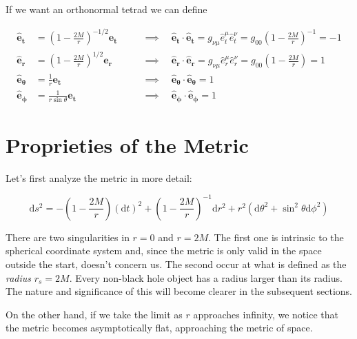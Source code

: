 If we want an orthonormal tetrad we can define

\begin{subequations}
\begin{align}
    \mathbf{\hat e_t} &= \left(1 - \frac{2M}{r}\right)^{-1/2} \mathbf{e_t}
    \quad &&\implies \quad
    \mathbf{\hat e_t \cdot \hat e_t} = g_{\nu \mu} \hat e_t^\mu \hat e_t^\nu
    = g_{00} \left(1 - \frac{2M}{r}\right)^{-1} = - 1
    \label{cap1:eq:local_ON_base_t}\\
    \mathbf{\hat e_r} &= \left(1 - \frac{2M}{r}\right)^{1/2} \mathbf{e_r}
    \quad &&\implies \quad
    \mathbf{\hat e_r \cdot \hat e_r} = g_{\nu \mu} \hat e_r^\mu \hat e_r^\nu
    = g_{00} \left(1 - \frac{2M}{r}\right) = 1 \\
    \mathbf{\hat e_\theta} &= \frac{1}{r} \mathbf{e_t}
    \quad &&\implies \quad
    \mathbf{\hat e_\theta \cdot \hat e_\theta} = 1 \\
    \mathbf{\hat e_\phi} &= \frac{1}{r \sin \theta} \mathbf{e_t}
    \quad &&\implies \quad
    \mathbf{\hat e_\phi \cdot \hat e_\phi} = 1
\end{align}
    \label{cap1:eq:local_ON_base}
\end{subequations}

\newpage


\section{Proprieties of the Metric}

Let's first analyze the \Sh metric in more detail:

\begin{equation}
    \mathrm{d}s^2 = - \left(1 - \frac{2 M}{r} \right) (\mathrm{d}t)^2
    + \left(1 - \frac{2 M}{r} \right)^{-1} \mathrm{d}r^2
    + r^2 (\mathrm{d}\theta^2 + \sin^2 \theta \mathrm{d}\phi^2)
    \label{cap1:eq:Sh_ds}
\end{equation}

There are two singularities in $r = 0$ and $r = 2M$.
The first one is intrinsic to the spherical coordinate system and, since the
metric is only valid in the space outside the start, doesn't concern us.
The second occur at what is defined as the \textit{\Sh radius} $r_s = 2M$.
Every non-black hole object has a radius larger than its \Sh radius.
The nature and significance of this will become clearer in the subsequent
sections.

On the other hand, if we take the limit as $r$ approaches infinity, we notice that the
metric becomes asymptotically flat, approaching the metric of \Mi space.

